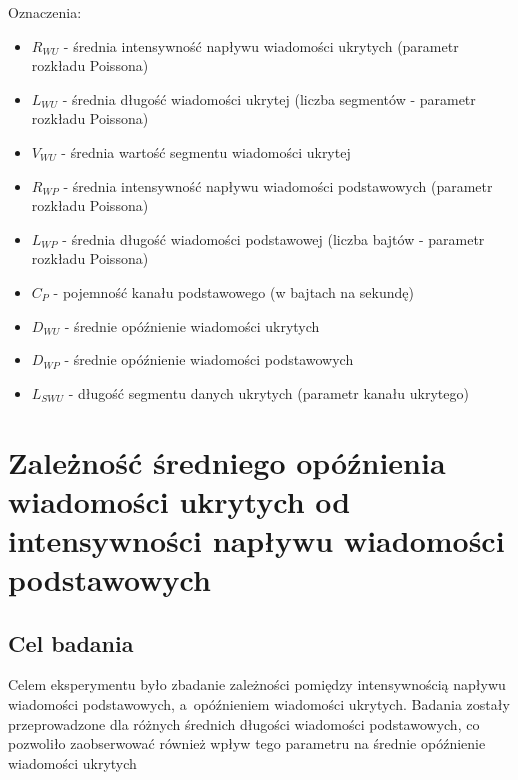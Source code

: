 \documentclass[a4paper, twoside, 12pt]{report}
\begin{document}
    Oznaczenia:
    \begin{itemize} \itemsep1pt \parskip0pt 
        \item \( R_{WU} \) - średnia intensywność napływu wiadomości ukrytych (parametr rozkładu Poissona)
        \item \( L_{WU} \) - średnia długość wiadomości ukrytej (liczba segmentów - parametr rozkładu Poissona)
        \item \( V_{WU} \) - średnia wartość segmentu wiadomości ukrytej
        \item \( R_{WP} \) - średnia intensywność napływu wiadomości podstawowych (parametr rozkładu Poissona)
        \item \( L_{WP} \) - średnia długość wiadomości podstawowej (liczba bajtów - parametr rozkładu Poissona)
        \item \( C_P \) - pojemność kanału podstawowego (w bajtach na sekundę)
        \item \( D_{WU} \) - średnie opóźnienie wiadomości ukrytych
        \item \( D_{WP} \) - średnie opóźnienie wiadomości podstawowych
        \item \( L_{SWU} \) - długość segmentu danych ukrytych (parametr kanału ukrytego)
    \end{itemize}

    \section{Zależność średniego opóźnienia wiadomości ukrytych od intensywności napływu wiadomości podstawowych}
        \subsection{Cel badania}
            Celem eksperymentu było zbadanie zależności pomiędzy intensywnością
            napływu wiadomości podstawowych, a~opóźnieniem wiadomości ukrytych.
            Badania zostały przeprowadzone dla różnych średnich długości wiadomości
            podstawowych, co pozwoliło zaobserwować również wpływ tego parametru
            na średnie opóźnienie wiadomości ukrytych
\end{document}

